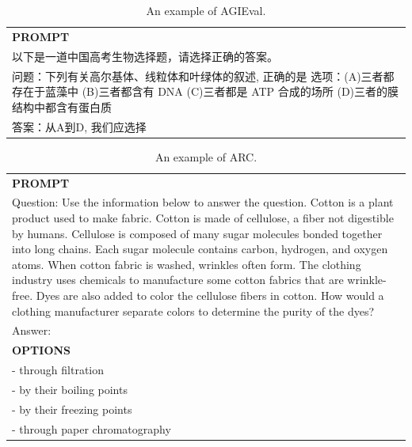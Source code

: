 
\begin{table}[h]
    \centering \small
\begin{tabular}{p{12cm}}
\toprule
\textbf{PROMPT}\\
以下是一道中国高考生物选择题，请选择正确的答案。\\
问题：下列有关高尔基体、线粒体和叶绿体的叙述, 正确的是 选项：(A)三者都存在于蓝藻中 (B)三者都含有 DNA (C)三者都是 ATP 合成的场所 (D)三者的膜结构中都含有蛋白质\\
答案：从A到D, 我们应选择\\
\bottomrule
\end{tabular}
    \caption{\centering An example of AGIEval.}
    \label{tab:agieval_eval_format_example}
\end{table}

\begin{table}[h]
    \centering \small
\begin{tabular}{p{12cm}}
\toprule
\textbf{PROMPT}\\
Question: Use the information below to answer the question. Cotton is a plant product used to make fabric. Cotton is made of cellulose, a fiber not digestible by humans. Cellulose is composed of many sugar molecules bonded together into long chains. Each sugar molecule contains carbon, hydrogen, and oxygen atoms. When cotton fabric is washed, wrinkles often form. The clothing industry uses chemicals to manufacture some cotton fabrics that are wrinkle-free. Dyes are also added to color the cellulose fibers in cotton. How would a clothing manufacturer separate colors to determine the purity of the dyes? \\
Answer: \\
\midrule
\textbf{OPTIONS}\\
- through filtration\\
- by their boiling points\\
- by their freezing points\\
- through paper chromatography\\
\bottomrule
\end{tabular}
    \caption{\centering An example of ARC.}
    \label{tab:arc_eval_format_example}
\end{table}

